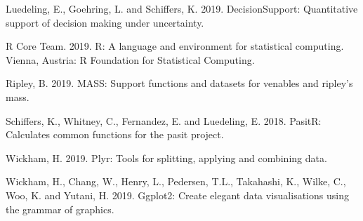 \documentclass[]{article}
\begin{document}
\leavevmode\hypertarget{ref-R-decisionSupport}{}%
Luedeling, E., Goehring, L. and Schiffers, K. 2019. DecisionSupport:
Quantitative support of decision making under uncertainty.

\leavevmode\hypertarget{ref-R-base}{}%
R Core Team. 2019. R: A language and environment for statistical
computing. Vienna, Austria: R Foundation for Statistical Computing.

\leavevmode\hypertarget{ref-R-MASS}{}%
Ripley, B. 2019. MASS: Support functions and datasets for venables and
ripley's mass.

\leavevmode\hypertarget{ref-R-pasitR}{}%
Schiffers, K., Whitney, C., Fernandez, E. and Luedeling, E. 2018.
PasitR: Calculates common functions for the pasit project.

\leavevmode\hypertarget{ref-R-plyr}{}%
Wickham, H. 2019. Plyr: Tools for splitting, applying and combining
data.

\leavevmode\hypertarget{ref-R-ggplot2}{}%
Wickham, H., Chang, W., Henry, L., Pedersen, T.L., Takahashi, K., Wilke,
C., Woo, K. and Yutani, H. 2019. Ggplot2: Create elegant data
visualisations using the grammar of graphics.
\end{document}
